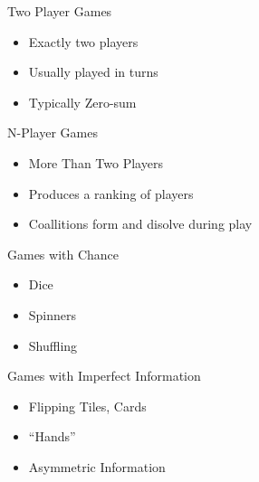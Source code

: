 \documentclass{powerdot}
\begin{document}
\begin{slide}{Two Player Games}
            {\vspace{1.5in}
              \begin{itemize}
                \item Exactly two players
                \item Usually played in turns
                \item Typically Zero-sum
              \end{itemize}
            }
\end{slide}

\begin{slide}{N-Player Games}
            {\vspace{1.5in}
              \begin{itemize}
                \item More Than Two Players
                \item Produces a ranking of players
                \item Coallitions form and disolve during play
              \end{itemize}
            }
\end{slide}

\begin{slide}{Games with Chance}
  {\begin{itemize}
      \item Dice
      \item Spinners
      \item Shuffling
    \end{itemize}
    }
\end{slide}

\begin{slide}{Games with Imperfect Information}
            {\vspace{2in}
              \begin{itemize}
                \item Flipping Tiles, Cards
                \item ``Hands''
                \item Asymmetric Information
            \end{itemize}}
\end{slide}
\end{document}
